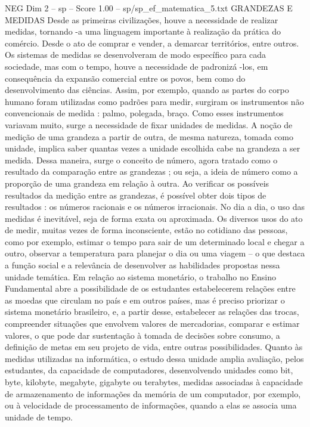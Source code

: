 \begin{textsample}{NEG Dim 2 – sp – Score 1.00 – sp/sp\_ef\_matematica\_5.txt}  \label{ex:f2_neg_087}
GRANDEZAS E MEDIDAS Desde as primeiras civilizações, houve a necessidade de realizar medidas, tornando -a uma linguagem importante à realização da prática do comércio.
Desde o ato de comprar e vender, a demarcar territórios, entre outros.
Os sistemas de medidas se desenvolveram de modo específico para cada sociedade, mas com o tempo, houve a necessidade de padronizá -los, em consequência da expansão comercial entre os povos, bem como do desenvolvimento das ciências.
Assim, por exemplo, quando as partes do corpo humano foram utilizadas como padrões para medir, surgiram os instrumentos não convencionais de medida : palmo, polegada, braço.
Como esses instrumentos variavam muito, surge a necessidade de fixar unidades de medidas.
A noção de medição de uma grandeza a partir de outra, de mesma natureza, tomada como unidade, implica saber quantas vezes a unidade escolhida cabe na grandeza a ser medida.
Dessa maneira, surge o conceito de número, agora tratado como o resultado da comparação entre as grandezas ; ou seja, a ideia de número como a proporção de uma grandeza em relação à outra.
Ao verificar os possíveis resultados da medição entre as grandezas, é possível obter dois tipos de resultados : os números racionais e os números irracionais.
No dia a dia, o uso das medidas é inevitável, seja de forma exata ou aproximada.
Os diversos usos do ato de medir, muitas vezes de forma inconsciente, estão no cotidiano das pessoas, como por exemplo, estimar o tempo para sair de um determinado local e chegar a outro, observar a temperatura para planejar o dia ou uma viagem – o que destaca a função social e a relevância de desenvolver as habilidades propostas nessa unidade temática.
Em relação ao sistema monetário, o trabalho no Ensino Fundamental abre a possibilidade de os estudantes estabelecerem relações entre as moedas que circulam no país e em outros países, mas é preciso priorizar o sistema monetário brasileiro, e, a partir desse, estabelecer as relações das trocas, compreender situações que envolvem valores de mercadorias, comparar e estimar valores, o que pode dar sustentação à tomada de decisões sobre consumo, a definição de metas em seu projeto de vida, entre outras possibilidades.
Quanto às medidas utilizadas na informática, o estudo dessa unidade amplia avaliação, pelos estudantes, da capacidade de computadores, desenvolvendo unidades como bit, byte, kilobyte, megabyte, gigabyte ou terabytes, medidas associadas à capacidade de armazenamento de informações da memória de um computador, por exemplo, ou à velocidade de processamento de informações, quando a elas se associa uma unidade de tempo.

\end{textsample}
